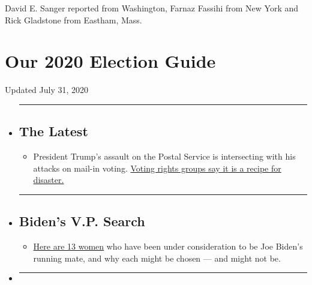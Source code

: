 David E. Sanger reported from Washington, Farnaz Fassihi from New York
and Rick Gladstone from Eastham, Mass.

\hypertarget{our-2020-election-guide}{%
\section{Our 2020 Election Guide}\label{our-2020-election-guide}}

Updated July 31, 2020

\begin{itemize}
\item
  \begin{center}\rule{0.5\linewidth}{\linethickness}\end{center}

  \hypertarget{the-latest}{%
  \subsection{The Latest}\label{the-latest}}

  \begin{itemize}
  \tightlist
  \item
    President Trump's assault on the Postal Service is intersecting with
    his attacks on mail-in voting.
    \href{https://www.nytimes.com/2020/07/31/us/politics/trump-usps-mail-delays.html?action=click\&pgtype=Article\&state=default\&region=BELOW_MAIN_CONTENT\&context=storylines_guide}{Voting
    rights groups say it is a recipe for disaster.}
  \end{itemize}
\item
  \begin{center}\rule{0.5\linewidth}{\linethickness}\end{center}

  \hypertarget{bidens-vp-search}{%
  \subsection{Biden's V.P. Search}\label{bidens-vp-search}}

  \begin{itemize}
  \tightlist
  \item
    \href{https://www.nytimes.com/article/biden-vice-president-2020.html?action=click\&pgtype=Article\&state=default\&region=BELOW_MAIN_CONTENT\&context=storylines_guide}{Here
    are 13 women} who have been under consideration to be Joe Biden's
    running mate, and why each might be chosen --- and might not be.
  \end{itemize}
\item
  \begin{center}\rule{0.5\linewidth}{\linethickness}\end{center}


\end{itemize}
